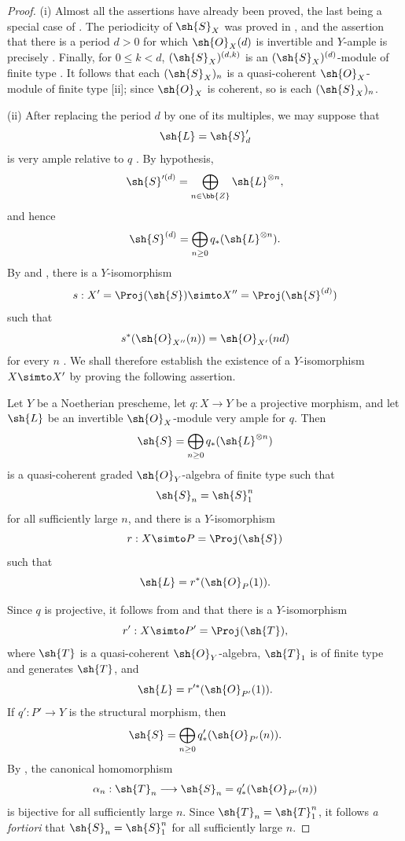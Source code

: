 \begin{proof}
(i) Almost all the assertions have already been proved, the last being a special case of .
The periodicity of $\sh{S}_X$ was proved in , and the assertion that there is a period $d>0$ for which $\sh{O}_X(d)$ is invertible and $Y$-ample is precisely .
Finally, for $0\leq k<d$, $(\sh{S}_X)^{(d,k)}$ is an $(\sh{S}_X)^{(d)}$-module of finite type .
It follows that each $(\sh{S}_X)_n$ is a quasi-coherent $\sh{O}_X$-module of finite type [ii]; since $\sh{O}_X$ is coherent, so is each $(\sh{S}_X)_n$.

(ii) After replacing the period $d$ by one of its multiples, we may suppose that
\[
  \sh{L}=\sh{S}'_d
\]
is very ample relative to $q$ .
By hypothesis,
\[
  \sh{S}'^{(d)}
  =\bigoplus_{n\in\bb{Z}}\sh{L}^{\otimes n},
\]
and hence
\[
  \sh{S}^{(d)}
  =\bigoplus_{n\geq0}q_*(\sh{L}^{\otimes n}).
\]
By  and , there is a $Y$-isomorphism
\[
  s:X'=\Proj(\sh{S})\simto
  X''=\Proj(\sh{S}^{(d)})
\]
such that
\[
  s^*(\sh{O}_{X''}(n))=\sh{O}_{X'}(nd)
\]
for every $n$ .
We shall therefore establish the existence of a $Y$-isomorphism $X\simto X'$ by proving the following assertion.

\begin{env}[2.3.4.1]
\label{III.2.3.4.1}
Let $Y$ be a Noetherian prescheme, let $q:X\to Y$ be a projective morphism, and let $\sh{L}$ be an invertible $\sh{O}_X$-module very ample for $q$.
Then
\[
  \sh{S}=\bigoplus_{n\geq0}q_*(\sh{L}^{\otimes n})
\]
is a quasi-coherent graded $\sh{O}_Y$-algebra of finite type such that
\[
  \sh{S}_n=\sh{S}_1^n
\]
for all sufficiently large $n$, and there is a $Y$-isomorphism
\[
  r:X\simto P=\Proj(\sh{S})
\]
such that
\[
  \sh{L}=r^*(\sh{O}_P(1)).
\]
\end{env}

Since $q$ is projective, it follows from  and  that there is a $Y$-isomorphism
\[
  r':X\simto P'=\Proj(\sh{T}),
\]
where $\sh{T}$ is a quasi-coherent $\sh{O}_Y$-algebra, $\sh{T}_1$ is of finite type and generates $\sh{T}$, and
\[
  \sh{L}=r'^*(\sh{O}_{P'}(1)).
\]
If $q':P'\to Y$ is the structural morphism, then
\[
  \sh{S}=\bigoplus_{n\geq0}q'_*(\sh{O}_{P'}(n)).
\]
By , the canonical homomorphism
\[
  \alpha_n:\sh{T}_n\longrightarrow
  \sh{S}_n=q'_*(\sh{O}_{P'}(n))
\]
is bijective for all sufficiently large $n$.
Since $\sh{T}_n=\sh{T}_1^n$, it follows \emph{a fortiori} that $\sh{S}_n=\sh{S}_1^n$ for all sufficiently large $n$.


\end{proof}
